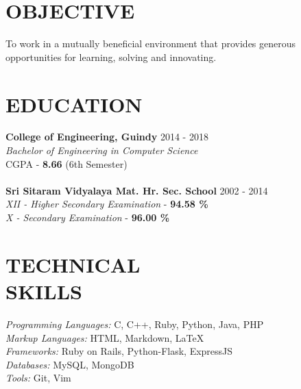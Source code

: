 \documentclass[margin, 10pt]{res} %
\begin{document}
\begin{resume}
\section{OBJECTIVE}
To work in a mutually beneficial environment that provides generous opportunities for learning, solving and innovating.
\section{EDUCATION}
{\bf College of Engineering, Guindy} \hfill 2014 - 2018 \\
{\sl Bachelor of Engineering in Computer Science} \\
{CGPA - \textbf{8.66} (6th Semester)} \\
\\
{\bf Sri Sitaram Vidyalaya Mat. Hr. Sec. School} \hfill 2002 - 2014 \\
{\sl XII - Higher Secondary Examination} - {\textbf{94.58 \%}} \\
{\sl X - Secondary Examination} - {\textbf{96.00 \%}}
\section{TECHNICAL \\ SKILLS} 
{\sl Programming Languages:} C, C++, Ruby, Python, Java, PHP \\
{\sl Markup Languages:} HTML, Markdown, LaTeX \\
{\sl Frameworks:} Ruby on Rails, Python-Flask, ExpressJS \\
{\sl Databases:} MySQL, MongoDB \\
{\sl Tools:} Git, Vim

\end{resume}
\end{document}
